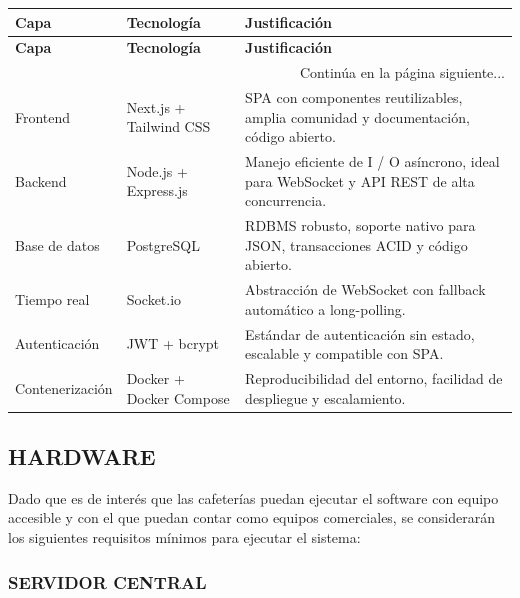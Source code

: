 \begin{tabularx}{\textwidth}{l X X}
\caption{Stack tecnológico} \label{tab:stack_tecnologico}\\
\toprule
\textbf{Capa} & \textbf{Tecnología} & \textbf{Justificación} \\
\midrule
\endfirsthead

\toprule
\textbf{Capa} & \textbf{Tecnología} & \textbf{Justificación} \\
\midrule
\endhead

\midrule
\multicolumn{3}{r}{\small Continúa en la página siguiente...} \\
\endfoot
\bottomrule
\endlastfoot

Frontend & Next.js + Tailwind CSS & SPA con componentes reutilizables, amplia comunidad y documentación, código abierto. \\
\addlinespace
Backend & Node.js + Express.js & Manejo eficiente de I / O asíncrono, ideal para WebSocket y API REST de alta concurrencia. \\
\addlinespace
Base de datos & PostgreSQL & RDBMS robusto, soporte nativo para JSON, transacciones ACID y código abierto. \\
\addlinespace
Tiempo real & Socket.io & Abstracción de WebSocket con fallback automático a long-polling. \\
\addlinespace
Autenticación & JWT + bcrypt & Estándar de autenticación sin estado, escalable y compatible con SPA. \\
\addlinespace
Contenerización & Docker + Docker Compose & Reproducibilidad del entorno, facilidad de despliegue y escalamiento. \\
\end{tabularx}
\endgroup

\subsection{HARDWARE}
Dado que es de interés que las cafeterías puedan ejecutar el software con equipo accesible y con el que puedan contar como equipos comerciales, se considerarán los siguientes requisitos mínimos para ejecutar el sistema:

\subsubsection{SERVIDOR CENTRAL}
\begingroup
\setlength{\LTleft}{\fill}
\setlength{\LTright}{\fill}

